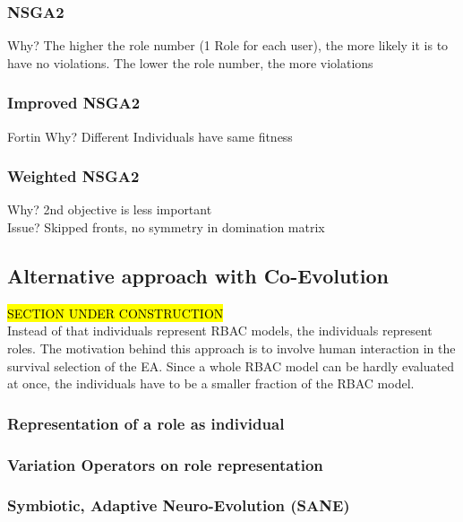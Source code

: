         \subsubsection{NSGA2}
        Why? The higher the role number (1 Role for each user), the more likely it is to have no violations. The lower the role number, the more violations
        \subsubsection{Improved NSGA2}
        Fortin
        Why? Different Individuals have same fitness
        \subsubsection{Weighted NSGA2}
        Why? 2nd objective is less important\\
        Issue? Skipped fronts, no symmetry in domination matrix

    \subsection{Alternative approach with Co-Evolution}
    \hl{SECTION UNDER CONSTRUCTION}\\
    Instead of that individuals represent RBAC models, the individuals represent roles. The motivation behind this approach is to involve human interaction in the survival selection of the EA. Since a whole RBAC model can be hardly evaluated at once, the individuals have to be a smaller fraction of the RBAC model.
        \subsubsection{Representation of a role as individual}
        \subsubsection{Variation Operators on role representation}
        \subsubsection{Symbiotic, Adaptive Neuro-Evolution (SANE)}
